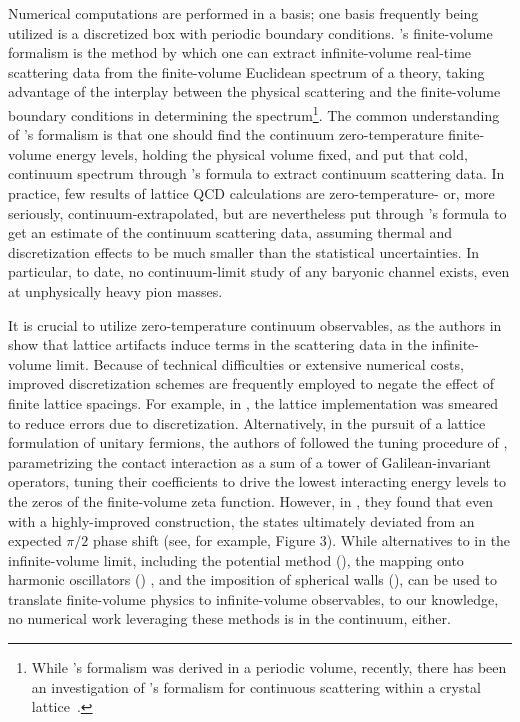 Numerical computations are performed in a basis; one basis frequently being utilized is a discretized box with periodic boundary conditions.
\Luscher's finite-volume formalism\cite{Hamber198399,luscher:1986I,luscher:1986II,wiese1989,Luscher1991,Luscher1991237} is the method by which one can extract infinite-volume real-time scattering data from the finite-volume Euclidean spectrum of a theory, taking advantage of the interplay between the physical scattering and the finite-volume boundary conditions in determining the spectrum\footnote{While \Luscher's formalism was derived in a periodic volume, recently, there has been an investigation of \Luscher's formalism for continuous scattering within a crystal lattice~\cite{Valiente:2015oya}.}.
The common understanding of \Luscher's formalism is that one should find the continuum zero-temperature finite-volume energy levels, holding the physical volume fixed, and put that cold, continuum spectrum through \Luscher's formula to extract continuum scattering data.
In practice, few results of lattice QCD calculations are zero-temperature- or, more seriously, continuum-extrapolated, but are nevertheless put through \Luscher's formula to get an estimate of the continuum scattering data, assuming thermal and discretization effects to be much smaller than the statistical uncertainties.
In particular, to date, no continuum-limit study of any baryonic channel exists, even at unphysically heavy pion masses.

It is crucial to utilize zero-temperature continuum observables, as the authors in  show that lattice artifacts induce terms in the scattering data in the infinite-volume limit.
Because of technical difficulties or extensive numerical costs, improved discretization schemes are frequently employed to negate the effect of finite lattice spacings.
For example, in , the lattice implementation was smeared to reduce errors due to discretization.
Alternatively, in the pursuit of a lattice formulation of unitary fermions, the authors of  followed the tuning procedure of , parametrizing the contact interaction as a sum of a tower of Galilean-invariant operators, tuning their coefficients to drive the lowest interacting energy levels to the zeros of the \Luscher finite-volume zeta function.
However, in , they found that even with a highly-improved construction, the states ultimately deviated from an expected $\pi/2$ phase shift (see, for example, Figure 3).
While alternatives to in the infinite-volume limit, including the potential method (), the mapping onto harmonic oscillators () , and the imposition of spherical walls (), can be used to translate finite-volume physics to infinite-volume observables, to our knowledge, no numerical work leveraging these methods is in the continuum, either.

